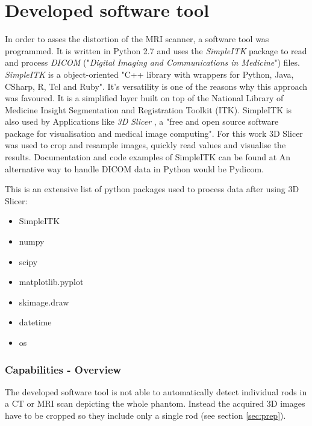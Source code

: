 \section{Developed software tool}

In order to asses the distortion of the MRI scanner, a software tool was programmed.
It is written in Python 2.7 and uses the \textit{SimpleITK} package to read and process \textit{DICOM} ("\textit{Digital Imaging and Communications in Medicine}") files. \cite{Python, DICOM}
\textit{SimpleITK} is a object-oriented "C++ library with wrappers for Python, Java, CSharp, R, Tcl and Ruby". \cite{SimpleITK, SimpleITK_started} It's versatility is one of the reasons why this approach was favoured.
It is a simplified layer built on top of the National Library of Medicine Insight Segmentation and Registration Toolkit (ITK). SimpleITK is also used by Applications like \textit{3D Slicer} , a "free and open source software package for
visualisation and medical image computing". \cite{3DSlicer, Kikinis2012} For this work 3D Slicer was used to crop and resample images, quickly read values and visualise the results.
Documentation and code examples of SimpleITK can be found at \cite{InsightSoftwareConsortium, Kyriakou-SimpleITK}
An alternative way to handle DICOM data in Python would be Pydicom. \cite{Pydicom, Kyriakou-Pydicom-VTK} 

This is an extensive list of python packages used to process data after using 3D Slicer:
\begin{itemize}
 \item SimpleITK
 \item numpy
 \item scipy
 \item matplotlib.pyplot \cite{Hunter2007}
 \item skimage.draw
 \item datetime
 \item os
\end{itemize}


\subsubsection{Capabilities - Overview}

The developed software tool is not able to automatically detect individual rods in a CT or MRI scan depicting the whole phantom.
Instead the acquired 3D images have to be cropped so they include only a single rod (see section \ref{sec:prep}).

